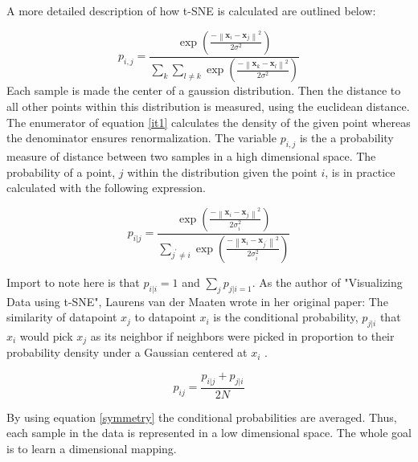 \documentclass[12pt, fleqn, titlepage]{article}
\newcommand{\norm}[1]{\left\lVert#1\right\rVert}
\newcommand{\1}[1]{\mathds{1}\left[#1\right]}
\begin{document}
A more detailed description of how t-SNE is calculated are outlined below:

\begin{equation}\label{it1}
		p_{i,j} = \frac{\exp(\frac{-\norm{\mathbf x_i - \mathbf x_j}^2}{2 \sigma^2})}{\sum_{k} \sum_{l \neq k} \exp (\frac{-\norm{\mathbf x_k - \mathbf x_l}^2}{2 \sigma^2})}
\end{equation}
Each sample is made the center of a gaussion distribution. Then the distance to all other points within this distribution is measured, using the euclidean distance. The enumerator of equation \eqref{it1} calculates the density of the given point whereas the denominator ensures renormalization. The variable $ p_{i,j} $ is the a probability measure of distance between two samples in a high dimensional space. The probability of a point, $ j $ within the distribution given the point $ i $, is in practice calculated with the following expression.

\begin{equation*}\label{key}
	p_{i \vert j} = \frac{\exp(\frac{-\norm{\mathbf x_i - \mathbf x_j}^2}{2 \sigma_i^2})}{\sum_{j^\prime \neq i} \exp (\frac{-\norm{\mathbf x_i - \mathbf x_{j^\prime}}^2}{2 \sigma_i^2})}
\end{equation*}

Import to note here is that $ p_{i \vert i} = 1$  and $ \sum_{j} p_{j \vert i = 1}$. As the author of "Visualizing Data using t-SNE", Laurens van der Maaten  wrote in her original paper: The similarity of datapoint $ x_j $ to datapoint $ x_i $ is the conditional probability, $ p_{j \vert i} $  that $ x_i $ would pick $ x_j $ as its neighbor if neighbors were picked in proportion to their probability density under a Gaussian centered at $  x_i $ \cite{tsne}.

\begin{equation}\label{symmetry}
	p_{ij} = \frac{	p_{i \vert j} + p_{j \vert i}}{2N}
\end{equation}

By using equation \eqref{symmetry} the conditional probabilities are averaged. Thus, each sample in the data is represented in a low dimensional space. The whole goal is to learn a dimensional mapping.
\end{document}
